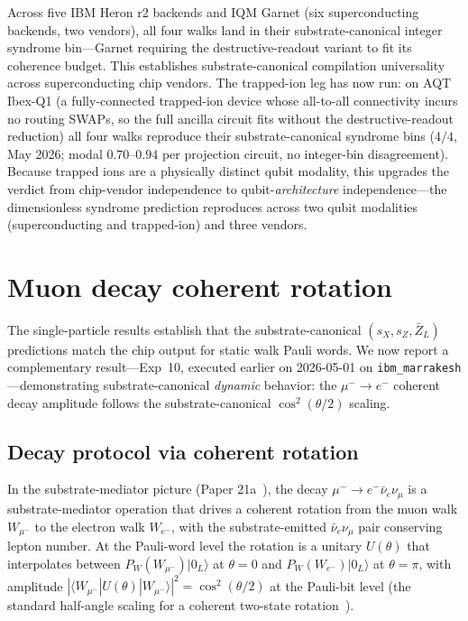 \documentclass[11pt]{article}
\newcommand{\barZ}{\bar Z_L}
\begin{document}
Across five IBM Heron r2 backends and IQM Garnet (six superconducting backends, two vendors), all four walks land in their substrate-canonical integer syndrome bin---Garnet requiring the destructive-readout variant to fit its coherence budget.  This establishes substrate-canonical compilation universality across superconducting chip vendors.  The trapped-ion leg has now run: on AQT Ibex-Q1 (a fully-connected trapped-ion device whose all-to-all connectivity incurs no routing SWAPs, so the full ancilla circuit fits without the destructive-readout reduction) all four walks reproduce their substrate-canonical syndrome bins ($4/4$, May 2026; modal $0.70$--$0.94$ per projection circuit, no integer-bin disagreement).  Because trapped ions are a physically distinct qubit modality, this upgrades the verdict from chip-vendor independence to qubit-\emph{architecture} independence---the dimensionless syndrome prediction reproduces across two qubit modalities (superconducting and trapped-ion) and three vendors.

\section{Muon decay coherent rotation}
\label{sec:muon-decay}

The single-particle results establish that the substrate-canonical $(s_X, s_Z, \barZ)$ predictions match the chip output for static walk Pauli words.  We now report a complementary result---Exp~10, executed earlier on 2026-05-01 on \texttt{ibm\_marrakesh}---demonstrating substrate-canonical \emph{dynamic} behavior: the $\mu^- \to e^-$ coherent decay amplitude follows the substrate-canonical $\cos^2(\theta/2)$ scaling.

\subsection{Decay protocol via coherent rotation}
\label{sec:decay-protocol}

In the substrate-mediator picture (Paper 21a~\cite[\S 3.6, \S 9.3]{Paper21a}), the decay $\mu^- \to e^- \bar\nu_e \nu_\mu$ is a substrate-mediator operation that drives a coherent rotation from the muon walk $W_{\mu^-}$ to the electron walk $W_{e^-}$, with the substrate-emitted $\bar\nu_e \nu_\mu$ pair conserving lepton number.  At the Pauli-word level the rotation is a unitary $U(\theta)$ that interpolates between $P_W(W_{\mu^-})|0_L\rangle$ at $\theta = 0$ and $P_W(W_{e^-})|0_L\rangle$ at $\theta = \pi$, with amplitude $|\langle W_{\mu^-} | U(\theta) | W_{\mu^-} \rangle|^2 = \cos^2(\theta/2)$ at the Pauli-bit level (the standard half-angle scaling for a coherent two-state rotation~\cite{NielsenChuang}).
\end{document}
